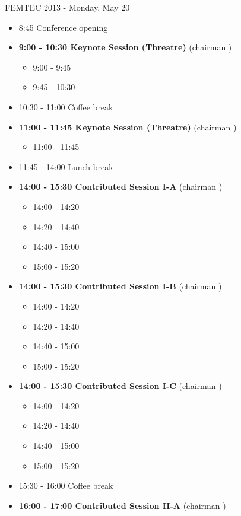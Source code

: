\documentclass[10pt, A4]{article}
\begin{document}
\centerline{\huge FEMTEC 2013 - Monday, May 20}
\vspace{4mm}

\begin{itemize}    
  \item 8:45 Conference opening
  \item {\bf 9:00 - 10:30 Keynote Session (Threatre)} (chairman ) 
  \begin{itemize}
    \item 9:00 - 9:45
    \item 9:45 - 10:30 
  \end{itemize}
  \item 10:30 - 11:00 Coffee break
  \item {\bf 11:00 - 11:45 Keynote Session (Threatre)} (chairman ) 
  \begin{itemize}
    \item 11:00 - 11:45
  \end{itemize}
  \item 11:45 - 14:00 Lunch break      
  \item {\bf 14:00 - 15:30 Contributed Session I-A} (chairman ) 
  \begin{itemize}
    \item 14:00 - 14:20 
    \item 14:20 - 14:40 
    \item 14:40 - 15:00 
    \item 15:00 - 15:20 
  \end{itemize}
  \item {\bf 14:00 - 15:30 Contributed Session I-B} (chairman ) 
  \begin{itemize}
    \item 14:00 - 14:20 
    \item 14:20 - 14:40 
    \item 14:40 - 15:00 
    \item 15:00 - 15:20 
  \end{itemize}
    \item {\bf 14:00 - 15:30 Contributed Session I-C} (chairman ) 
  \begin{itemize}
    \item 14:00 - 14:20 
    \item 14:20 - 14:40 
    \item 14:40 - 15:00 
    \item 15:00 - 15:20 
  \end{itemize}
  \item 15:30 - 16:00 Coffee break
  \item {\bf 16:00 - 17:00 Contributed Session II-A} (chairman ) 

\end{itemize}
\end{document}

